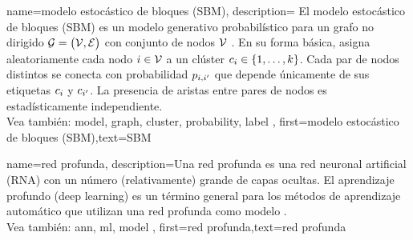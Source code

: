 {
	name=modelo estocástico de bloques (SBM),
	description={
		El modelo estocástico de bloques (SBM) es un modelo generativo probabilístico para un grafo no dirigido $\mathcal{G} = \big( \mathcal{V}, \mathcal{E} \big)$ con conjunto de nodos $\mathcal{V}$ \cite{AbbeSBM2018}.
		En su forma básica, asigna aleatoriamente cada nodo $i \in \mathcal{V}$ a un clúster $c_{i} \in \{1,\ldots,k\}$.
		Cada par de nodos distintos se conecta con probabilidad $p_{i,i'}$ que depende únicamente de sus etiquetas $c_{i}$ y $c_{i'}$.
		La presencia de aristas entre pares de nodos es estadísticamente independiente.
		\\
		Vea también: \gls{model}, \gls{graph}, \gls{cluster}, \gls{probability}, \gls{label}  },
	first={modelo estocástico de bloques (SBM)},text={SBM}
}


{name={red profunda},
	description={Una red profunda es una red neuronal artificial (RNA) con un número (relativamente) grande 
	de capas ocultas. El aprendizaje profundo (deep learning) es un término general para los métodos de aprendizaje automático 
	que utilizan una red profunda como modelo  \cite{Goodfellow-et-al-2016}.
	\\
		Vea también: \gls{ann}, \gls{ml}, \gls{model} },
	first={red profunda},text={red profunda} 
}

\newcommand{\gaussiancenter}{3}

